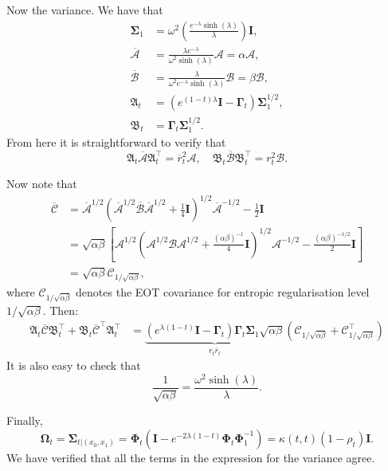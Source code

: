 \documentclass{article}
\newcommand{\Id}{\mathbf{I}}
\newcommand{\Ac}{\mathcal{A}}
\newcommand{\Bc}{\mathcal{B}}
\newcommand{\Cc}{\mathcal{C}}
\newcommand{\bmathfrak}[1]{\bm{\mathfrak{#1}}}
\theoremstyle{newstyle}
\begin{document}
Now the variance. We have that
\begin{align}
  \bm{\Sigma}_1 &= \omega^2 \left( \frac{e^{-\lambda} \sinh(\lambda)}{\lambda} \right) \Id, \\
  \overline{\bm{\Ac}} &= \frac{\lambda e^{-\lambda}}{\omega^2 \sinh(\lambda)} \bm{\Ac} = \alpha \bm{\Ac}, \\
  \overline{\bm{\Bc}} &= \frac{\lambda}{\omega^2 e^{-\lambda} \sinh(\lambda)} \bm{\Bc} = \beta \bm{\Bc}, \\
  \bmathfrak{A}_t &= \left( e^{(1-t)\lambda} \Id - \bm{\Gamma}_t \right) \bm{\Sigma}_1^{1/2}, \\
  \bmathfrak{B}_t &= \bm{\Gamma}_t \bm{\Sigma}_1^{1/2}. 
\end{align}
From here it is straightforward to verify that
\begin{equation}
  \bmathfrak{A}_t \overline{\bm{\Ac}} \bmathfrak{A}_t^\top = \overline{r}_t^2 \bm{\Ac}, \quad \bmathfrak{B}_t \overline{\bm{\Bc}} \bmathfrak{B}_t^\top = r_t^2 \bm{\Bc}.
\end{equation}

Now note that
\begin{align}
  \overline{\bm{\Cc}} &= \overline{\bm{\Ac}}^{1/2} \left( \overline{\bm{\Ac}}^{1/2} \overline{\bm{\Bc}} \overline{\bm{\Ac}}^{1/2} + \frac{1}{4} \Id \right)^{1/2} \overline{\bm{\Ac}}^{-1/2} - \frac{1}{2} \Id \\
                 &= \sqrt{\alpha\beta} \left[ \bm{\Ac}^{1/2} \left( \bm{\Ac}^{1/2} \bm{\Bc} \bm{\Ac}^{1/2} + \frac{(\alpha\beta)^{-1}}{4} \Id \right)^{1/2} \bm{\Ac}^{-1/2} - \frac{(\alpha \beta)^{-1/2}}{2} \Id \right] \\
                 &= \sqrt{\alpha\beta} \bm{\Cc}_{1/\sqrt{\alpha\beta}}, 
\end{align}
where $\bm{\Cc}_{1/\sqrt{\alpha\beta}}$ denotes the EOT covariance for entropic regularisation level $1/\sqrt{\alpha\beta}$. Then:
\begin{align}
  \bmathfrak{A}_t \overline{\bm{\Cc}} \bmathfrak{B}_t^\top + \bmathfrak{B}_t \overline{\bm{\Cc}}^\top \bmathfrak{A}_t^\top &= \underbrace{(e^{\lambda(1-t)} \Id - \bm{\Gamma}_t) \bm{\Gamma}_t \bm{\Sigma}_1 \sqrt{\alpha \beta}}_{r_t \overline{r}_t} (\bm{\Cc}_{1/\sqrt{\alpha\beta}} + \bm{\Cc}_{1/\sqrt{\alpha\beta}}^\top)
\end{align}
It is also easy to check that
\[
  \frac{1}{\sqrt{\alpha\beta}} = \frac{\omega^2 \sinh(\lambda)}{\lambda}. 
\]

Finally,
\begin{equation}
  \bm{\Omega}_t = \bm{\Sigma}_{t | (x_0, x_1)} = \bm{\Phi}_t (\Id - e^{-2\lambda(1-t)}\bm{\Phi}_t \bm{\Phi}_1^{-1} ) = \kappa(t, t) (1 - \rho_t) \Id. 
\end{equation}
We have verified that all the terms in the expression for the variance agree. 
\end{document}
